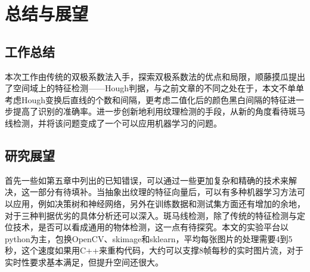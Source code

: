 \chapter{总结与展望}
\section{工作总结}
本次工作由传统的双极系数法入手，探索双极系数法的优点和局限，顺藤摸瓜提出了空间域上的特征检测——Hough判据，与之前文章的不同之处在于，本文不单单考虑Hough变换后直线的个数和间隔，更考虑二值化后的颜色黑白间隔的特征进一步提高了识别的准确率。进一步创新地利用纹理检测的手段，从新的角度看待斑马线检测，并将该问题变成了一个可以应用机器学习的问题。
\section{研究展望}
首先一些如第五章中列出的已知错误，可以通过一些更加复杂和精确的技术来解决，这一部分有待填补。当抽象出纹理的特征向量后，可以有多种机器学习方法可以应用，例如决策树和神经网络，另外在训练数据和测试集方面还有增加的余地，对于三种判据优劣的具体分析还可以深入。斑马线检测，除了传统的特征检测与定位技术，是否可以看成通用的物体检测，这一点有待探究。本文的实验平台以python为主，包换OpenCV、skimage和sklearn，平均每张图片的处理需要4到5秒，这个速度如果用C++来重构代码，大约可以支撑8帧每秒的实时图片流，对于实时性要求基本满足，但提升空间还很大。